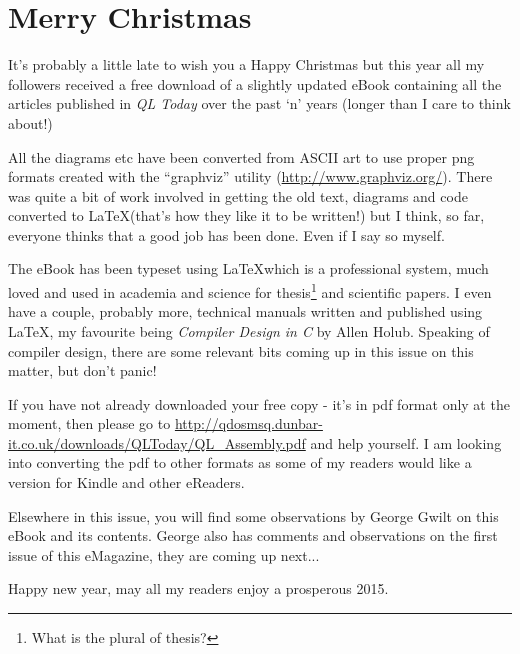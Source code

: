 \chapter{Merry Christmas}

It's probably a little late to wish you a Happy Christmas but this year all my followers received a free download of a slightly updated eBook containing all the articles published in \emph{QL Today} over the past `n' years (longer than I care to think about!) 

All the diagrams etc have been converted from ASCII art to use proper png formats created with the ``graphviz'' utility (\url{http://www.graphviz.org/}). There was quite a bit of work involved in getting the old text, diagrams and code converted to \LaTeX (that's how they like it to be written!) but I think, so far, everyone thinks that a good job has been done. Even if I say so myself.

The eBook has been typeset using \LaTeX which is a professional system, much loved and used in academia and science for thesis\footnote{What is the plural of thesis?} and scientific papers. I even have a couple, probably more, technical manuals written and published using \LaTeX, my favourite being \emph{Compiler Design in C} by Allen Holub. Speaking of compiler design, there are some relevant bits coming up in this issue on this matter, but don't panic! 

If you have not already downloaded your free copy - it's in pdf format only at the moment, then please go to \url{http://qdosmsq.dunbar-it.co.uk/downloads/QLToday/QL_Assembly.pdf} and help yourself. I am looking into converting the pdf to other formats as some of my readers would like a version for Kindle and other eReaders.

Elsewhere in this issue, you will find some observations by George Gwilt on this eBook and its contents. George also has comments and observations on the first issue of this eMagazine, they are coming up next...

Happy new year, may all my readers enjoy a prosperous 2015.
